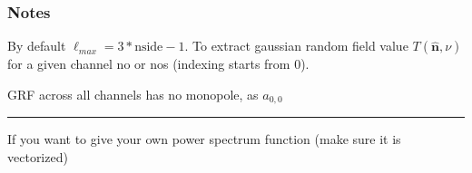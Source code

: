 \documentclass[a4paper,11pt,oneside,english,openany]{sphinxmanual}
\begin{document}
\begin{fulllineitems}
\begin{quote}
\begin{description}
\end{description}\end{quote}

\clearpage
\subsubsection*{Notes}

\sphinxAtStartPar
By default \(\ell_{max} = 3*\text{nside} -1\).
To extract gaussian random field value \(T(\hat{\mathbf{n}}, \nu)\) for a given channel no or no\textquotesingle{}s (indexing starts from 0).

\begin{sphinxVerbatim}[commandchars=\\\{\}]
    
    
   
 
   
 
   \PYG{p}{[}     \PYG{p}{]}
    
 \PYG{p}{[}\PYG{p}{]}             
\end{sphinxVerbatim}

\sphinxAtStartPar
GRF across all channels has no monopole, as \(a_{0,0}\) 


\bigskip\hrule\bigskip


\sphinxAtStartPar
If you want to give your own power spectrum function (make sure it is vectorized)


\end{fulllineitems}
\end{document}

